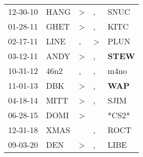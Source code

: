 \begin{supertabular}{p{0.07\textwidth}p{0.06\textwidth}p{0.02\textwidth}p{0.02\textwidth}p{0.06\textwidth}}
 12-30-10\textsuperscript{} &  HANG\textsuperscript{} &  \textgreater &             , &           SNUC\textsuperscript{} \\
 01-28-11\textsuperscript{} &  GHET\textsuperscript{} &  \textgreater &             , &           KITC\textsuperscript{} \\
 02-17-11\textsuperscript{} &  LINE\textsuperscript{} &             , &  \textgreater &           PLUN\textsuperscript{} \\
 03-12-11\textsuperscript{} &  ANDY\textsuperscript{} &  \textgreater &             , &  \textbf{STEW\textsuperscript{}} \\
 10-31-12\textsuperscript{} &  46n2\textsuperscript{} &             , &             , &           m4no\textsuperscript{} \\
 11-01-13\textsuperscript{} &   DBK\textsuperscript{} &  \textgreater &             , &   \textbf{WAP\textsuperscript{}} \\
 04-18-14\textsuperscript{} &  MITT\textsuperscript{} &  \textgreater &             , &           SJIM\textsuperscript{} \\
 06-28-15\textsuperscript{} &  DOMI\textsuperscript{} &  \textgreater &               &                            *CS2* \\
 12-31-18\textsuperscript{} &  XMAS\textsuperscript{} &               &             , &           ROCT\textsuperscript{} \\
 09-03-20\textsuperscript{} &   DEN\textsuperscript{} &  \textgreater &             , &           LIBE\textsuperscript{} \\
\end{supertabular}
